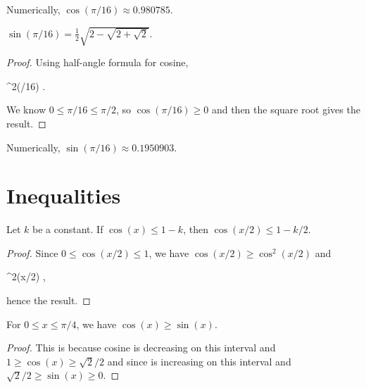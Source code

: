 \begin{remark}
Numerically, $\cos(\pi/16)\approx0.980785$.
\end{remark}

\begin{proposition}
$\displaystyle{\sin(\pi/16) = \frac{1}{2}\sqrt{2 - \sqrt{2 + \sqrt{2}}}}$.
\end{proposition}

\begin{proof}
Using half-angle formula for cosine,
\begin{calculation}
  \sin^{2}(\pi/16)
  .
\end{calculation}
We know $0\leq\pi/16\leq\pi/2$, so $\cos(\pi/16)\geq 0$ and then the
square root gives the result.
\end{proof}

\begin{remark}
Numerically, $\sin(\pi/16)\approx0.1950903$.
\end{remark}

\section{Inequalities}

\begin{proposition}
Let $k$ be a constant. If $\cos(x)\leq 1 - k$, then $\cos(x/2)\leq 1 - k/2$.
\end{proposition}

\begin{proof}
Since $0\leq \cos(x/2)\leq 1$, we have $\cos(x/2)\geq\cos^{2}(x/2)$ and
\begin{calculation}
\cos^{2}(x/2)
,
\end{calculation}
hence the result.
\end{proof}

\begin{proposition}
For $0\leq x\leq \pi/4$, we have $\cos(x)\geq\sin(x)$.
\end{proposition}

\begin{proof}
This is because cosine is decreasing on this interval and $1\geq\cos(x)\geq\sqrt{2}/2$
and since is increasing on this interval and $\sqrt{2}/2\geq\sin(x)\geq0$.
\end{proof}

